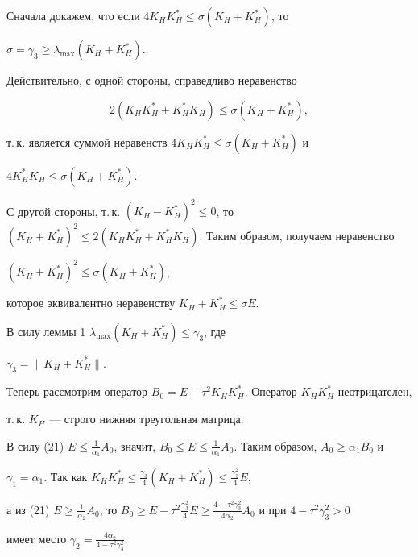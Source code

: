 \begin{pf} 


Сначала докажем, что если $4K_H K^*_H\le\sigma(K_H+K^*_H)$, то 


$\sigma=\gamma_3\ge\lambda_{\max}(K_H+K^*_H)$. 


Действительно, с одной стороны, справедливо неравенство 


$$ 


2(K_H K^*_H+K^*_H K_H)\le 


\sigma(K_H+K^*_H), 


$$ 


т.\,к. является суммой неравенств $4K_H K^*_H\le\sigma(K_H+K^*_H)$ и 


$4K^*_H K_H\le\sigma(K_H+K^*_H)$. 


С другой стороны, т.\,к. $(K_H-K^*_H)^2\le0$, то $(K_H+K^*_H)^2\le2(K_H 


K^*_H+K^*_H K_H)$. Таким образом, получаем неравенство 


$(K_H+K^*_H)^2\le\sigma(K_H+K^*_H)$, 


которое эквивалентно неравенству $K_H+K^*_H\le\sigma E$. 


В силу леммы 1\; $\lambda_{\max}(K_H+K^*_H)\le\gamma_3$, где 


$\gamma_3=\|K_H+K^*_H\|$. 


 


Теперь рассмотрим оператор $B_0=E-\tau^2K_H K^*_H$. Оператор $K_H 


K^*_H$ неотрицателен, 


т.\,к. $K_H$ --- строго нижняя треугольная матрица. 


В силу (21)\; $E\le\frac{1}{\alpha_1}A_0$, значит, $B_0\le 


E\le\frac{1}{\alpha_1}A_0$. Таким образом, $A_0\ge\alpha_1B_0$ и 


$\gamma_1=\alpha_1$. Так как $K_H 


K^*_H\le\frac{\gamma_3}{4}(K_H+K^*_H)\le\frac{\gamma^2_3}{4}E$, 


а из (21)\; $E\ge\frac{1}{\alpha_2}A_0$, то $B_0\ge 


E-\tau^2\frac{\gamma^2_3}{4}E\ge 


\frac{4-\tau^2\gamma^2_3}{4\alpha_2}A_0$ и при $4-\tau^2\gamma^2_3>0$ 


имеет место $\gamma_2=\frac{4\alpha_2}{4-\tau^2\gamma^2_3}$. 


\end{pf} 


